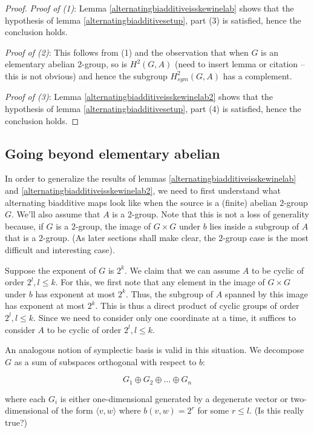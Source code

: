 \documentclass[10pt]{amsart}
\begin{document}
\begin{proof}
  {\em Proof of (1)}: Lemma \ref{alternatingbiadditiveisskewinelab}
  shows that the hypothesis of lemma \ref{alternatingbiadditivesetup},
  part (3) is satisfied, hence the conclusion holds.

  {\em Proof of (2)}: This follows from (1) and the observation that
  when $G$ is an elementary abelian $2$-group, so is $H^2(G,A)$ (need
  to insert lemma or citation -- this is not obvious) and hence the
  subgroup $H^2_{sym}(G,A)$ has a complement.

  {\em Proof of (3)}: Lemma \ref{alternatingbiadditiveisskewinelab2}
  shows that the hypothesis of lemma \ref{alternatingbiadditivesetup},
  part (4) is satisfied, hence the conclusion holds.
\end{proof}

\subsection{Going beyond elementary abelian}

In order to generalize the results of lemmas
\ref{alternatingbiadditiveisskewinelab} and
\ref{alternatingbiadditiveisskewinelab2}, we need to first understand
what alternating biadditive maps look like when the source is a
(finite) abelian $2$-group $G$. We'll also assume that $A$ is a
$2$-group. Note that this is not a loss of generality because, if $G$
is a $2$-group, the image of $G \times G$ under $b$ lies inside a
subgroup of $A$ that is a $2$-group. (As later sections shall make
clear, the $2$-group case is the most difficult and interesting case).

Suppose the exponent of $G$ is $2^k$. We claim that we can assume $A$
to be cyclic of order $2^l, l \le k$. For this, we first note that any
element in the image of $G \times G$ under $b$ has exponent at most
$2^k$. Thus, the subgroup of $A$ spanned by this image has exponent at
most $2^k$. This is thus a direct product of cyclic groups of order
$2^l, l \le k$. Since we need to consider only one coordinate at a
time, it suffices to consider $A$ to be cyclic of order $2^l, l \le
k$.

An analogous notion of symplectic basis is valid in this situation. We
decompose $G$ as a sum of subspaces orthogonal with respect to $b$:

$$G_1 \oplus G_2 \oplus \dots \oplus G_n$$

where each $G_i$ is either one-dimensional generated by a degenerate
vector or two-dimensional of the form $\langle v,w \rangle$ where
$b(v,w) = 2^r$ for some $r \le l$. (Is this really true?)
\end{document}
